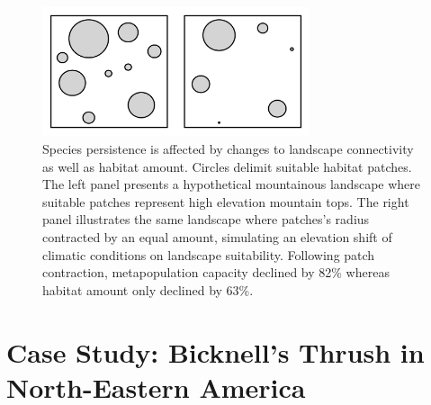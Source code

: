 \documentclass[12pt]{article}
\begin{document}
\begin{figure}
\hypertarget{fig:concept_metapop_structure}{%
\centering
\includegraphics[width=0.7\textwidth,height=\textheight]{./manuscript/img/concept_metapop_structure.png}
\caption{Species persistence is affected by changes to landscape
connectivity as well as habitat amount. Circles delimit suitable habitat
patches. The left panel presents a hypothetical mountainous landscape
where suitable patches represent high elevation mountain tops. The right
panel illustrates the same landscape where patches's radius contracted
by an equal amount, simulating an elevation shift of climatic conditions
on landscape suitability. Following patch contraction, metapopulation
capacity declined by 82\% whereas habitat amount only declined by
63\%.}\label{fig:concept_metapop_structure}
}
\end{figure}

\hypertarget{case-study-bicknells-thrush-in-north-eastern-america}{%
\section{Case Study: Bicknell's Thrush in North-Eastern
America}\label{case-study-bicknells-thrush-in-north-eastern-america}}
\end{document}
